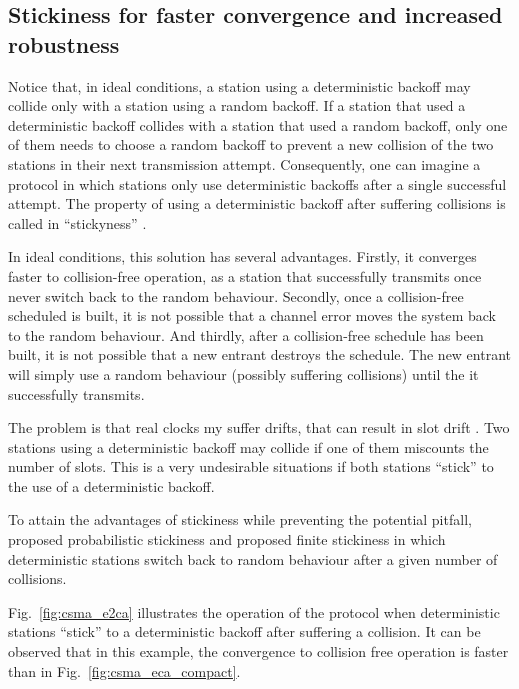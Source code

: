 \documentclass[journal]{IEEEtran}
\begin{document}
\subsection{Stickiness for faster convergence and increased robustness}

Notice that, in ideal conditions, a station using a deterministic backoff may collide only with a station using a random backoff.
If a station that used a deterministic backoff collides with a station that used a random backoff, only one of them needs to choose a random backoff to prevent a new collision of the two stations in their next transmission attempt.
Consequently, one can imagine a protocol in which stations only use deterministic backoffs after a single successful attempt.
The property of using a deterministic backoff after suffering collisions is called in ``stickyness'' \cite{fang2011dlm}.

In ideal conditions, this solution has several advantages.
Firstly, it converges faster to collision-free operation, as a station that successfully transmits once never switch back to the random behaviour.
Secondly, once a collision-free scheduled is built, it is not possible that a channel error moves the system back to the random behaviour.
And thirdly, after a collision-free schedule has been built, it is not possible that a new entrant destroys the schedule.
The new entrant will simply use a random behaviour (possibly suffering collisions) until the it successfully transmits.

The problem is that real clocks my suffer drifts, that can result in slot drift \cite{gong2012asd}.
Two stations using a deterministic backoff may collide if one of them miscounts the number of slots.
This is a very undesirable situations if both stations ``stick'' to the use of a deterministic backoff.

To attain the advantages of stickiness while preventing the potential pitfall, \cite{fang2011dlm} proposed probabilistic stickiness and \cite{barcelo2011tcf} proposed finite stickiness in which deterministic stations switch back to random behaviour after a given number of collisions.

Fig.~\ref{fig:csma_e2ca} illustrates the operation of the protocol when deterministic stations ``stick'' to a deterministic backoff after suffering a collision.
It can be observed that in this example, the convergence to collision free operation is faster than in Fig.~\ref{fig:csma_eca_compact}.
\end{document}

